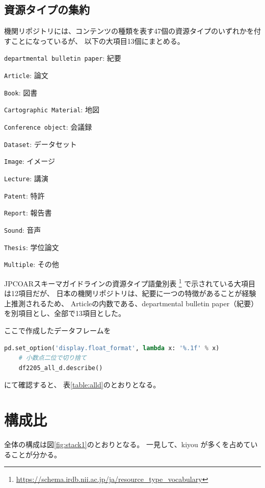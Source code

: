 \documentclass[submit,noauthor]{ono}
\def\|{\verb|}
\begin{document}
%2.1
\subsection{資源タイプの集約}
機関リポジトリには、コンテンツの種類を表す47個の資源タイプのいずれかを付すことになっているが、
\cite{ozono}
以下の大項目13個にまとめる。

\begin{Enumerate}
	\item \|departmental bulletin paper|: 紀要
	\item \|Article|: 論文
	\item \|Book|: 図書
	\item \|Cartographic Material|: 地図
	\item \|Conference object|: 会議録
	\item \|Dataset|: データセット
	\item \|Image|: イメージ
	\item \|Lecture|: 講演
	\item \|Patent|: 特許
	\item \|Report|: 報告書
	\item \|Sound|: 音声
	\item \|Thesis|: 学位論文
	\item \|Multiple|: その他
\end{Enumerate}%

JPCOARスキーマガイドラインの資源タイプ語彙別表
\footnote{\url{https://schema.irdb.nii.ac.jp/ja/resource_type_vocabulary}}
で示されている大項目は12項目だが、
日本の機関リポジトリは、紀要に一つの特徴があることが経験上推測されるため、
Articleの内数である、departmental bulletin paper（紀要）を別項目とし、全部で13項目とした。

ここで作成したデータフレームを

\begin{lstlisting}[language=Python,breaklines]
	pd.set_option('display.float_format', lambda x: '%.1f' % x)
	# 小数点二位で切り捨て
	df2205_all_d.describe()
\end{lstlisting}

にて確認すると、
表\ref{table:alld}のとおりとなる。

\section{構成比}
全体の構成は図\ref{fig:stack1}のとおりとなる。
一見して、kiyou が多くを占めていることが分かる。
\end{document}
